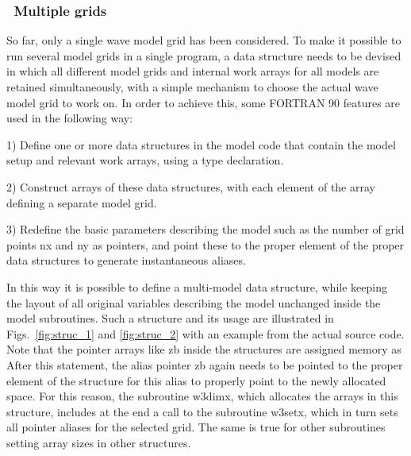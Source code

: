 \vsssub
\subsubsection{~Multiple grids} \label{sec:mgrids}
\vsssub

So far, only a single wave model grid has been considered.  To make it
possible to run several model grids in a single program, a data structure
needs to be devised in which all different model grids and internal work
arrays for all models are retained simultaneously, with a simple mechanism to
choose the actual wave model grid to work on. In order to achieve this, some
FORTRAN 90 features \citep[e.g.,][]{bk:MR99} are used in the following way:



\begin{list}{}{\rightmargin 8mm \leftmargin 10mm }

\item [1)] Define one or more data structures in the model code that contain
           the model setup and relevant work arrays, using a {\F type}
           declaration.

\item [2)] Construct arrays of these data structures, with each element of the
           array defining a separate model grid.

\item [3)] Redefine the basic parameters describing the model such as the
           number of grid points {\F nx} and {\F ny} as pointers, and point
           these to the proper element of the proper data structures to
           generate instantaneous aliases.

\end{list}

\noindent
In this way it is possible to define a multi-model data structure, while
keeping the layout of all original variables describing the model unchanged
inside the model subroutines.  Such a structure and its usage are illustrated
in Figs.~\ref{fig:struc_1} and \ref{fig:struc_2} with an example from the
actual source code. Note that the pointer arrays like {\F zb} inside the
structures are assigned memory as 
After this statement, the alias pointer {\F zb} again needs to be pointed to
the proper element of the structure for this alias to properly point to the
newly allocated space. For this reason, the subroutine {\F w3dimx}, which
allocates the arrays in this structure, includes at the end a call to the
subroutine {\F w3setx}, which in turn sets all pointer aliases for the
selected grid. The same is true for other subroutines setting array sizes in
other structures.

